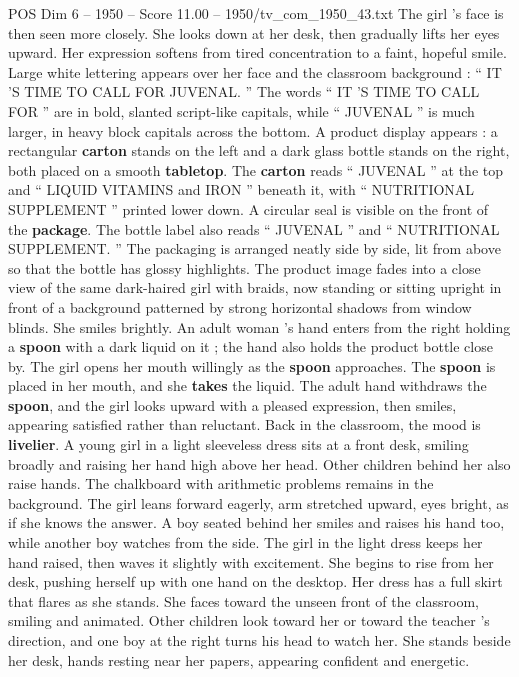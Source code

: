 \begin{textsample}{POS Dim 6 – 1950 – Score 11.00 – 1950/tv\_com\_1950\_43.txt}
The girl ’s face is then seen more closely.
She looks down at her desk, then gradually lifts her eyes upward.
Her expression softens from tired concentration to a faint, hopeful smile.
Large white lettering appears over her face and the classroom background : “ IT ’S TIME TO CALL FOR JUVENAL. ” The words “ IT ’S TIME TO CALL FOR ” are in bold, slanted script-like capitals, while “ JUVENAL ” is much larger, in heavy block capitals across the bottom.
A product display appears : a rectangular \textbf{carton} stands on the left and a dark glass bottle stands on the right, both placed on a smooth \textbf{tabletop}.
The \textbf{carton} reads “ JUVENAL ” at the top and “ LIQUID VITAMINS and IRON ” beneath it, with “ NUTRITIONAL SUPPLEMENT ” printed lower down.
A circular seal is visible on the front of the \textbf{package}.
The bottle label also reads “ JUVENAL ” and “ NUTRITIONAL SUPPLEMENT. ” The packaging is arranged neatly side by side, lit from above so that the bottle has glossy highlights.
The product image fades into a close view of the same dark-haired girl with braids, now standing or sitting upright in front of a background patterned by strong horizontal shadows from window blinds.
She smiles brightly.
An adult woman ’s hand enters from the right holding a \textbf{spoon} with a dark liquid on it ; the hand also holds the product bottle close by.
The girl opens her mouth willingly as the \textbf{spoon} approaches.
The \textbf{spoon} is placed in her mouth, and she \textbf{takes} the liquid.
The adult hand withdraws the \textbf{spoon}, and the girl looks upward with a pleased expression, then smiles, appearing satisfied rather than reluctant.
Back in the classroom, the mood is \textbf{livelier}.
A young girl in a light sleeveless dress sits at a front desk, smiling broadly and raising her hand high above her head.
Other children behind her also raise hands.
The chalkboard with arithmetic problems remains in the background.
The girl leans forward eagerly, arm stretched upward, eyes bright, as if she knows the answer.
A boy seated behind her smiles and raises his hand too, while another boy watches from the side.
The girl in the light dress keeps her hand raised, then waves it slightly with excitement.
She begins to rise from her desk, pushing herself up with one hand on the desktop.
Her dress has a full skirt that flares as she stands.
She faces toward the unseen front of the classroom, smiling and animated.
Other children look toward her or toward the teacher ’s direction, and one boy at the right turns his head to watch her.
She stands beside her desk, hands resting near her papers, appearing confident and energetic.

\end{textsample}
